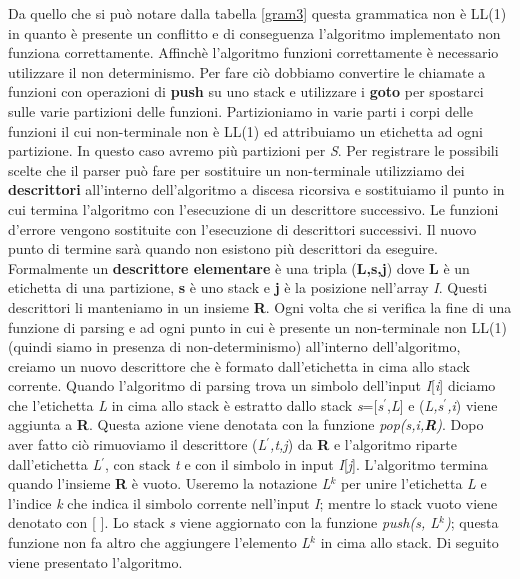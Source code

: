Da quello che si può notare dalla tabella \ref{gram3} questa grammatica non è LL(1) in quanto è presente un conflitto e di conseguenza l'algoritmo implementato non funziona correttamente. Affinchè l'algoritmo funzioni correttamente è necessario utilizzare il non determinismo. Per fare ciò dobbiamo convertire le chiamate a funzioni con operazioni di \textbf{push} su uno stack e utilizzare i \textbf{goto} per spostarci sulle varie partizioni delle funzioni. Partizioniamo in varie parti i corpi delle funzioni il cui non-terminale non è LL(1) ed attribuiamo un etichetta ad ogni partizione. In questo caso avremo più partizioni per \textit{S}. Per registrare le possibili scelte che il parser può fare per sostituire un non-terminale utilizziamo dei \textbf{descrittori} all'interno dell'algoritmo a discesa ricorsiva e sostituiamo il punto in cui termina l'algoritmo con l'esecuzione di un descrittore successivo. Le funzioni d'errore vengono sostituite con l'esecuzione di descrittori successivi. Il nuovo punto di termine sarà quando non esistono più descrittori da eseguire. Formalmente un \textbf{descrittore elementare} è una tripla (\textbf{L,s,j}) dove \textbf{L} è un etichetta di una partizione, \textbf{s} è uno stack e \textbf{j} è la posizione nell'array \textit{I}. Questi descrittori li manteniamo in un insieme \textbf{R}. Ogni volta che si verifica la fine di una funzione di parsing e ad ogni punto in cui è presente un non-terminale non LL(1) (quindi siamo in presenza di non-determinismo) all'interno dell'algoritmo, creiamo un nuovo descrittore che è formato dall'etichetta in cima allo stack corrente. Quando l'algoritmo di parsing trova un simbolo dell'input \textit{I}[\textit{i}] diciamo che l'etichetta \textit{L} in cima allo stack è estratto dallo stack \textit{s}=[\textit{s$^{'}$},\textit{L}] e (\textit{L,s$^{'}$,i}) viene aggiunta a \textbf{R}. Questa azione viene denotata con la funzione \textit{pop(s,i,\textbf{R})}. Dopo aver fatto ciò rimuoviamo il descrittore (\textit{L$^{'}$,t,j}) da \textbf{R} e l'algoritmo riparte dall'etichetta \textit{L$^{'}$}, con stack \textit{t} e con il simbolo in input \textit{I}[\textit{j}]. L'algoritmo termina quando l'insieme \textbf{R} è vuoto. Useremo la notazione \textit{L}$^{k}$ per unire l'etichetta \textit{L} e l'indice \textit{k} che indica il simbolo corrente nell'input \textit{I}; mentre lo stack vuoto viene denotato con [ ]. Lo stack \textit{s} viene aggiornato con la funzione \textit{push(s, L$^{k}$)}; questa funzione non fa altro che aggiungere  l'elemento \textit{L}$^{k}$ in cima allo stack. Di seguito viene presentato l'algoritmo.\par
